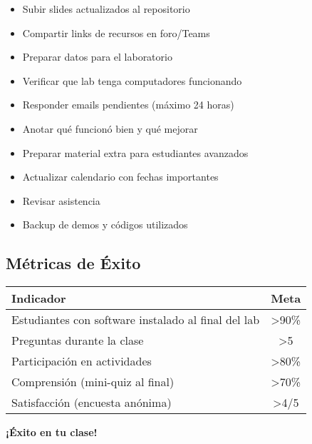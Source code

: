 \documentclass[11pt,a4paper]{article}
\begin{document}
\begin{itemize}[label=$\square$]
    \item Subir slides actualizados al repositorio
    \item Compartir links de recursos en foro/Teams
    \item Preparar datos para el laboratorio
    \item Verificar que lab tenga computadores funcionando
    \item Responder emails pendientes (máximo 24 horas)
    \item Anotar qué funcionó bien y qué mejorar
    \item Preparar material extra para estudiantes avanzados
    \item Actualizar calendario con fechas importantes
    \item Revisar asistencia
    \item Backup de demos y códigos utilizados
\end{itemize}

\subsection{Métricas de Éxito}

\begin{center}
\begin{tabular}{|l|c|}
\hline
\textbf{Indicador} & \textbf{Meta} \\
\hline
Estudiantes con software instalado al final del lab & >90\% \\
Preguntas durante la clase & >5 \\
Participación en actividades & >80\% \\
Comprensión (mini-quiz al final) & >70\% \\
Satisfacción (encuesta anónima) & >4/5 \\
\hline
\end{tabular}
\end{center}

\vspace{1cm}

\begin{center}
\large{\textbf{¡Éxito en tu clase!}}
\end{center}
\end{document}
